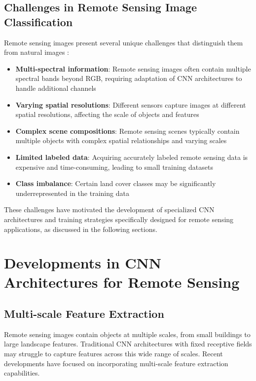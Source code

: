 \documentclass[12pt,a4paper]{article}
\begin{document}
\subsection{Challenges in Remote Sensing Image Classification}
Remote sensing images present several unique challenges that distinguish them from natural images \cite{zhu2017deep}:

\begin{itemize}
\item \textbf{Multi-spectral information}: Remote sensing images often contain multiple spectral bands beyond RGB, requiring adaptation of CNN architectures to handle additional channels
\item \textbf{Varying spatial resolutions}: Different sensors capture images at different spatial resolutions, affecting the scale of objects and features \cite{cheng2016survey}
\item \textbf{Complex scene compositions}: Remote sensing scenes typically contain multiple objects with complex spatial relationships and varying scales \cite{xia2017aid}
\item \textbf{Limited labeled data}: Acquiring accurately labeled remote sensing data is expensive and time-consuming, leading to small training datasets \cite{zhu2017deep}
\item \textbf{Class imbalance}: Certain land cover classes may be significantly underrepresented in the training data
\end{itemize}

These challenges have motivated the development of specialized CNN architectures and training strategies specifically designed for remote sensing applications, as discussed in the following sections.

\section{Developments in CNN Architectures for Remote Sensing}
\label{sec:developments}

\subsection{Multi-scale Feature Extraction}
Remote sensing images contain objects at multiple scales, from small buildings to large landscape features. Traditional CNN architectures with fixed receptive fields may struggle to capture features across this wide range of scales. Recent developments have focused on incorporating multi-scale feature extraction capabilities.
\end{document}
